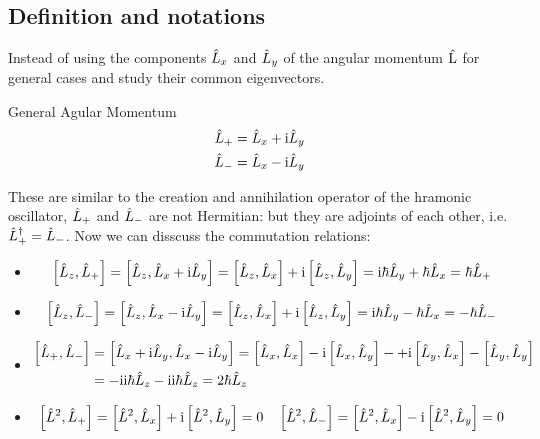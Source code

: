 \subsection{Definition and notations}

Instead of using the components $\hat{L}_x$ and $\hat{L}_y$ of the angular momentum $\mathrm{\hat{L}}$ for general cases and study their common eigenvectors.
\begin{definition}{General Agular Momentum}
    \begin{align}
        \hat{L}_+ & = \hat{L}_x + \mathrm{i} \hat{L}_y \label{dfn:l+}\\
        \hat{L}_- &= \hat{L}_x - \mathrm{i} \hat{L}_y \label{dfn:l-}
    \end{align}
\end{definition}
These are similar to the creation and annihilation operator of the hramonic oscillator, $\hat{L}_+$ and $\hat{L}_-$ are not Hermitian: but they are adjoints of each other, i.e. $\hat{L}_+^ \dag =\hat{L}_-$. Now we can disscuss the commutation relations: 
\begin{itemize}
    \item \begin{align*}
        \left[ \hat{L}_z , \hat{L}_+ \right] = \left[ \hat{L}_z , \hat{L}_x + \mathrm{i} \hat{L}_y \right] = \left[ \hat{L}_z , \hat{L}_x \right] + \mathrm{i} \left[ \hat{L}_z , \hat{L}_y \right] = \mathrm{i} \hbar \hat{L}_y + \hbar \hat{L}_x = \hbar \hat{L}_+ 
    \end{align*}
    \item \begin{eqnarray*}
        \left[ \hat{L}_z , \hat{L}_- \right] = \left[ \hat{L}_z , \hat{L}_x - \mathrm{i} \hat{L}_y \right] = \left[ \hat{L}_z , \hat{L}_x \right] + \mathrm{i} \left[ \hat{L}_z , \hat{L}_y \right] = \mathrm{i} \hbar \hat{L}_y -\hbar \hat{L}_x = - \hbar \hat{L}_- \label{eq:comm_lz_l-}
    \end{eqnarray*}
    \item \begin{align*}
        \left[ \hat{L}_+ , \hat{L}_- \right] &= \left[ \hat{L}_x + \mathrm{i} \hat{L}_y , \hat{L}_x - \mathrm{i} \hat{L}_y \right] = \left[ \hat{L}_x , \hat{L}_x \right] - \mathrm{i} \left[ \hat{L}_x , \hat{L}_y \right] -+\mathrm{i} \left[ \hat{L}_y , \hat{L}_x \right] - \left[ \hat{L}_y , \hat{L}_y \right] \\
        &= -\mathrm{i} \mathrm{i} \hbar \hat{L}_z - \mathrm{i} \mathrm{i} \hbar \hat{L}_z = 2 \hbar \hat{L}_z
    \end{align*}
    \item \begin{align*}
        \left[ \hat{L}^2 , \hat{L}_+ \right] = \left[ \hat{L}^2 , \hat{L}_x \right] + \mathrm{i} \left[ \hat{L}^2 , \hat{L}_y \right] = 0 \quad \left[ \hat{L}^2 , \hat{L}_- \right] = \left[ \hat{L}^2 , \hat{L}_x \right] - \mathrm{i} \left[ \hat{L}^2 , \hat{L}_y \right] = 0 
    \end{align*}
\end{itemize}


